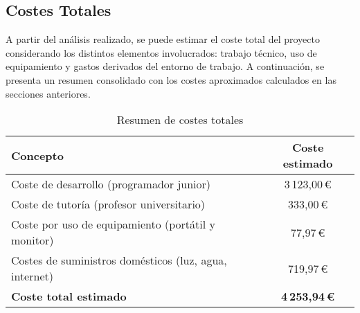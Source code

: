 \subsection{Costes Totales}
A partir del análisis realizado, se puede estimar el coste total del proyecto considerando los distintos elementos involucrados: trabajo técnico, uso de equipamiento y gastos derivados del entorno de trabajo. A continuación, se presenta un resumen consolidado con los costes aproximados calculados en las secciones anteriores.

\begin{table}[H]
\centering
\begin{tabular}{|l|c|}
\hline
\textbf{Concepto} & \textbf{Coste estimado} \\
\hline
Coste de desarrollo (programador junior) & 3\,123,00\,\euro{} \\
Coste de tutoría (profesor universitario) & 333,00\,\euro{} \\
Coste por uso de equipamiento (portátil y monitor) & 77,97\,\euro{} \\
Costes de suministros domésticos (luz, agua, internet) & 719,97\,\euro{} \\
\hline
\textbf{Coste total estimado} & \textbf{4\,253,94\,\euro{}} \\
\hline
\end{tabular}
\caption{Resumen de costes totales}
\label{tab:costes_totales}
\end{table}

